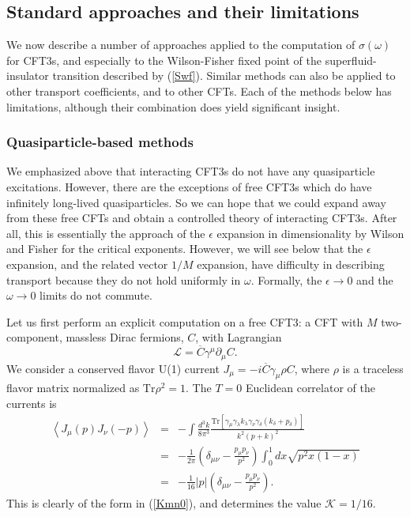 \documentclass[10pt, oneside]{book}
\def\nn{\nonumber}
\def\be{\begin{equation}}
\def\ee{\end{equation}}
\newcommand{\bea}{\begin{eqnarray}}
\newcommand{\eea}{\end{eqnarray}}
\begin{document}
\begin{doublespace}
\subsection{Standard approaches and their limitations}

We now describe a number of approaches applied to the computation of $\sigma (\omega)$ for CFT3s, and especially to the Wilson-Fisher fixed
point of the superfluid-insulator transition described by (\ref{Swf}). Similar methods can also be applied to other transport coefficients, and to other CFTs.
Each of the methods below has limitations, although their combination does yield significant insight.

\subsubsection{Quasiparticle-based methods}

We emphasized above that interacting CFT3s do not have any quasiparticle excitations. However, there are the exceptions of free CFT3s which do 
have infinitely long-lived quasiparticles. So we can hope that we could expand away from these free CFTs and obtain a controlled theory of interacting
CFT3s. After all, this is essentially the approach of the $\epsilon$ expansion in dimensionality 
by Wilson and Fisher for the critical exponents. However, we will see below
that the $\epsilon$ expansion, and the related vector $1/M$ expansion, have difficulty in describing transport because they do not hold uniformly in $\omega$.
Formally, the $\epsilon \rightarrow 0$ and the $\omega \rightarrow 0$ limits do not commute.

Let us first perform an explicit computation on a free CFT3: a CFT with $M$ two-component, massless Dirac fermions, $C$, with Lagrangian
\be
\mathcal{L} = \overline{C} \gamma^\mu \partial_\mu C.
\ee
We consider a conserved flavor U(1) current $J_\mu = - i \overline{C} \gamma_\mu \rho C$, where $\rho$ is a traceless flavor matrix normalized as $\mbox{Tr} \rho^2 = 1$. The $T=0$ Euclidean correlator of the currents is
\bea
\left\langle J_\mu (p) J_\nu ( - p) \right\rangle &=& - \int \frac{d^3 k}{8 \pi^3} \frac{ \mbox{Tr} \left[ \gamma_\mu \gamma_\lambda k_\lambda 
\gamma_\nu \gamma_\delta ( k_\delta + p_\delta) \right] }{k^2 (p+k)^2} \nn\\
&=&- \frac{1}{2\pi} \left( \delta_{\mu\nu} - \frac{p_\mu p_\nu}{p^2} \right) 
\int_0^1 dx \sqrt{p^2 x (1-x)} \nn\\
&=& - \frac{1}{16} |p| \left( \delta_{\mu\nu} - \frac{p_\mu p_\nu}{p^2} \right).
\label{Kmn}
\eea
This is clearly of the form in (\ref{Kmn0}), and determines the value $\mathcal{K} = 1/16$.


\end{doublespace}
\end{document}
